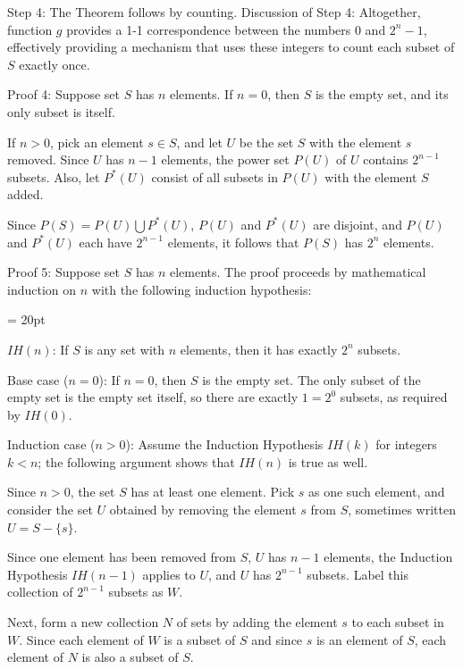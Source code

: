 {\ital Step 4:}  The Theorem follows by counting.\hfil\break
{\ital Discussion of Step 4:}
Altogether, function $g$ provides a 1-1 correspondence between the numbers $0$ and $2^n-1$, effectively providing a mechanism that uses these integers to count each subset of $S$ exactly once.  

\vfill\eject

{\bold Proof 4:}  Suppose set $S$ has $n$ elements.\hfil\break
If $n=0$, then $S$ is the empty set, and its only subset is itself.

If $n>0$, pick an element $s \in S$, and let $U$ be the set $S$ with the element $s$ removed. Since $U$ has $n-1$ elements, the power set $P(U)$ of $U$ contains $2^{n-1}$ subsets. Also, let $P^*(U)$ consist of all subsets in $P(U)$ with the element $S$ added.  

Since $P(S) = P(U)  \bigcup P^*(U)$,  $P(U)$ and $P^*(U)$ are disjoint, and $P(U)$ and $P^*(U)$ each have $2^{n-1}$ elements, it follows that $P(S)$ has $2^n$ elements. 

\bigskip
\line{\hrulefill}
{\bold Proof 5:}  Suppose set $S$ has $n$ elements.\hfil\break
The proof proceeds by mathematical induction on $n$ with the following induction hypothesis:

{\parindent = 20pt  

\item {} $IH(n)$:  If $S$ is any set with $n$ elements, then it has exactly $2^n$ subsets.

}

{\ital Base case ($n=0$):}  If $n=0$, then $S$ is the empty set.  The only subset of the empty set is the empty set itself, so there are exactly $1=2^0$ subsets, as required by $IH(0)$.

{\ital Induction case ($n>0$):}  Assume the Induction Hypothesis $IH(k)$ for integers $k < n$; the following argument shows that $IH(n)$ is true as well.

Since $n>0$, the set $S$ has at least one element.  Pick $s$ as one such element, and consider the set $U$ obtained by removing the element $s$ from $S$, sometimes written $U = S - \{s\}$.  

Since one element has been removed from $S$, $U$ has $n-1$ elements, the Induction Hypothesis $IH(n-1)$ applies to $U$, and $U$ has $2^{n-1}$ subsets.  Label this collection of $2^{n-1}$ subsets as $W$.

Next, form a new collection $N$ of sets by adding the element $s$ to each subset in $W$.  Since each element of $W$ is a subset of $S$ and since $s$ is an element of $S$, each element of $N$ is also a subset of $S$.

